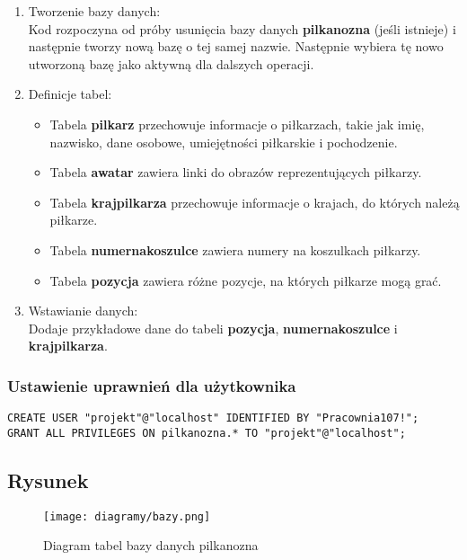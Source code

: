             \begin{enumerate}
                \item Tworzenie bazy danych:\\
                Kod rozpoczyna od próby usunięcia bazy danych \textbf{pilkanozna} (jeśli istnieje) i następnie tworzy nową bazę o tej samej nazwie.
                Następnie wybiera tę nowo utworzoną bazę jako aktywną dla dalszych operacji.
                \item  Definicje tabel:
                \begin{itemize}
                    \item Tabela \textbf{pilkarz} przechowuje informacje o piłkarzach, takie jak imię, nazwisko, dane osobowe, umiejętności piłkarskie i pochodzenie.
                    \item Tabela \textbf{awatar} zawiera linki do obrazów reprezentujących piłkarzy.
                    \item Tabela \textbf{krajpilkarza} przechowuje informacje o krajach, do których należą piłkarze.
                    \item Tabela \textbf{numernakoszulce} zawiera numery na koszulkach piłkarzy.
                    \item Tabela \textbf{pozycja} zawiera różne pozycje, na których piłkarze mogą grać.
                \end{itemize}
                             
                \item Wstawianie danych:\\
                Dodaje przykładowe dane do tabeli \textbf{pozycja}, \textbf{numernakoszulce} i \textbf{krajpilkarza}.
            \end{enumerate}

        \subsubsection{Ustawienie uprawnień dla użytkownika}
        \begin{lstlisting}
CREATE USER "projekt"@"localhost" IDENTIFIED BY "Pracownia107!"; 
GRANT ALL PRIVILEGES ON pilkanozna.* TO "projekt"@"localhost";
        \end{lstlisting}

    \pagebreak
    \subsection{Rysunek}
        \begin{figure}[!htb]
            \centering
            \texttt{[image: diagramy/bazy.png]}
            \caption{Diagram tabel bazy danych pilkanozna}
        \end{figure}